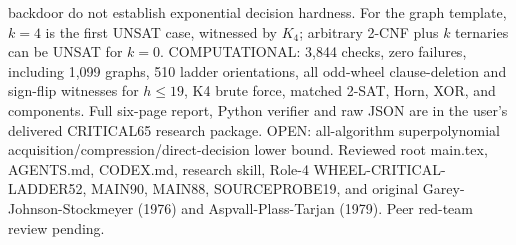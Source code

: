 \documentclass{article}
\begin{document}
backdoor do not establish exponential decision hardness.
For the graph template, $k=4$ is the first UNSAT case,
witnessed by $K_4$; arbitrary 2-CNF plus $k$ ternaries
can be UNSAT for $k=0$.
COMPUTATIONAL: 3,844 checks, zero failures, including
1,099 graphs, 510 ladder orientations, all odd-wheel
clause-deletion and sign-flip witnesses for $h\le19$,
K4 brute force, matched 2-SAT, Horn, XOR, and components.
Full six-page report, Python verifier and raw JSON are in
the user's delivered CRITICAL65 research package.
OPEN: all-algorithm superpolynomial
acquisition/compression/direct-decision lower bound.
Reviewed root main.tex, AGENTS.md, CODEX.md, research skill,
Role-4 WHEEL-CRITICAL-LADDER52, MAIN90, MAIN88, SOURCEPROBE19,
and original Garey-Johnson-Stockmeyer (1976) and
Aspvall-Plass-Tarjan (1979). Peer red-team review pending.
\end{document}
